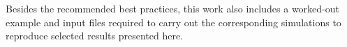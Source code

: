 \documentclass[9pt,bestpractices]{livecoms}
\begin{document}
Besides the recommended best practices, this work also includes a worked-out
example and input files required to carry out the corresponding simulations to
reproduce selected results presented here.


%
%
\end{document}
